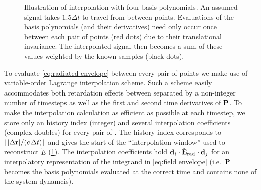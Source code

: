 \begin{figure}
  
  \caption{\label{fig:interpolation}Illustration of interpolation with four basis polynomials.
    An assumed signal takes $1.5\Delta t$ to travel from between points.
    Evaluations of the basis polynomials (and their derivatives) need only occur once between each pair of points (red dots) due to their translational invariance.
    The interpolated signal then becomes a sum of these values weighted by the known samples (black dots).
  }
\end{figure}

To evaluate \cref{eq:radiated envelope} between every pair of points we make use of variable-order Lagrange interpolation scheme.
Such a scheme easily accommodates both retardation effects between \qds{} separated by a non-integer number of timesteps as well as the first and second time derivatives of $\vb{P}$.
To make the interpolation calculation as efficient as possible at each timestep, we store only an history index (integer) and several interpolation coefficients (complex doubles) for every pair of \qds{}.
The history index corresponds to $\lfloor \abs{\Delta \vb{r}}/(c \, \Delta t) \rfloor$ and gives the start of the ``interpolation window'' used to reconstruct $\tilde{E}$ (\cref{fig:interpolation}).
The interpolation coefficients hold $\vb{d}_i \cdot \tilde{\vb{E}}_\text{rad} \cdot \vb{d}_j$ for an interpolatory representation of the integrand in \cref{eq:field envelope} (i.e.\ $\tilde{\vb{P}}$ becomes the basis polynomials evaluated at the correct time and contains none of the system dynamcis).

